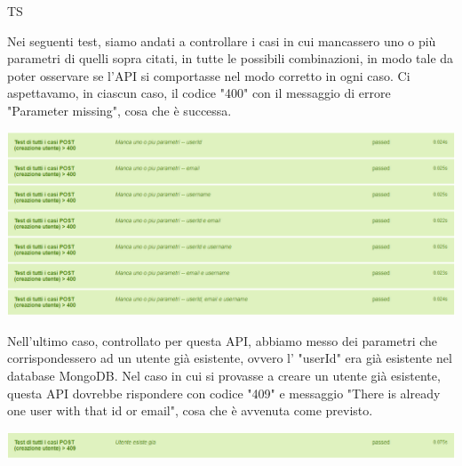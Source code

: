 \begin{listaPersonale}{TS}
\begin{center}
                \end{center}
                Nei seguenti test, siamo andati a controllare i casi in cui mancassero uno o più parametri di quelli sopra citati, in tutte le possibili combinazioni, in modo tale da poter osservare se l'API si comportasse nel modo corretto in ogni caso. Ci aspettavamo, in ciascun caso, il codice "400" con il messaggio di errore "Parameter missing", cosa che è successa.
                \begin{center}
                        \includegraphics[width=1\textwidth, height=0.25\textheight]{img/png/tests/UtentePost/400_missingParameter_PostUtente.png}
                \end{center}
                Nell'ultimo caso, controllato per questa API, abbiamo messo dei parametri che corrispondessero ad un utente già esistente, ovvero l' "userId" era già esistente nel database MongoDB. Nel caso in cui si provasse a creare un utente già esistente, questa API dovrebbe rispondere con codice "409" e messaggio "There is already one user with that id or email", cosa che è avvenuta come previsto.
                \begin{center}
                        \includegraphics[width=1\textwidth, height=0.05\textheight]{img/png/tests/UtentePost/409_postUtente.png}

\end{center}
\end{listaPersonale}
